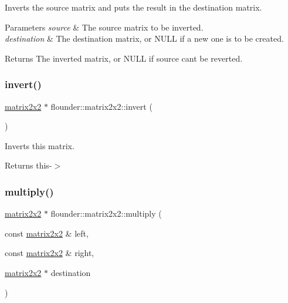 Inverts the source matrix and puts the result in the destination matrix. 


\begin{DoxyParams}{Parameters}
{\em source} & The source matrix to be inverted. \\
\hline
{\em destination} & The destination matrix, or N\+U\+LL if a new one is to be created. \\
\hline
\end{DoxyParams}
\begin{DoxyReturn}{Returns}
The inverted matrix, or N\+U\+LL if source can\textquotesingle{}t be reverted. 
\end{DoxyReturn}
\mbox{\label{classflounder_1_1matrix2x2_a88dc423971ee40b21df08f8ae5b03d43}} 
\subsubsection{\texorpdfstring{invert()}{invert()}\hspace{0.1cm}{\footnotesize\ttfamily [2/2]}}
{\footnotesize\ttfamily \hyperlink{classflounder_1_1matrix2x2}{matrix2x2} $\ast$ flounder\+::matrix2x2\+::invert (\begin{DoxyParamCaption}{ }\end{DoxyParamCaption})}



Inverts this matrix. 

\begin{DoxyReturn}{Returns}
this-\/$>$ 
\end{DoxyReturn}
\mbox{\label{classflounder_1_1matrix2x2_ab038a15b43141ba85b9779ba3c772579}} 
\subsubsection{\texorpdfstring{multiply()}{multiply()}}
{\footnotesize\ttfamily \hyperlink{classflounder_1_1matrix2x2}{matrix2x2} $\ast$ flounder\+::matrix2x2\+::multiply (\begin{DoxyParamCaption}\item[{const \hyperlink{classflounder_1_1matrix2x2}{matrix2x2} \&}]{left,  }\item[{const \hyperlink{classflounder_1_1matrix2x2}{matrix2x2} \&}]{right,  }\item[{\hyperlink{classflounder_1_1matrix2x2}{matrix2x2} $\ast$}]{destination }\end{DoxyParamCaption})\hspace{0.3cm}{\ttfamily [static]}}



